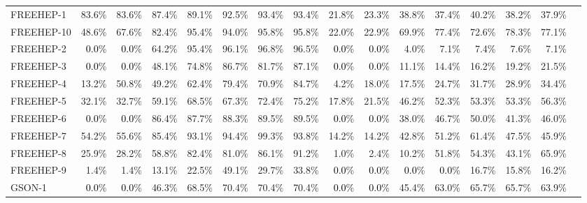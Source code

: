 \begin{tabular}{ l rrrrrrr rrrrrrrr}
FREEHEP-1 & 83.6\% & 83.6\% & 87.4\% & 89.1\% & 92.5\% & 93.4\% & 93.4\% & 21.8\% & 23.3\% & 38.8\% & 37.4\% & 40.2\% & 38.2\% & 37.9\%\\ 
FREEHEP-10 & 48.6\% & 67.6\% & 82.4\% & 95.4\% & 94.0\% & 95.8\% & 95.8\% & 22.0\% & 22.9\% & 69.9\% & 77.4\% & 72.6\% & 78.3\% & 77.1\%\\ 
FREEHEP-2 & \cellcolor{light-gray} \textcolor{black}{0.0}\% & \cellcolor{light-gray} \textcolor{black}{0.0}\% & 64.2\% & 95.4\% & 96.1\% & 96.8\% & 96.5\% & \cellcolor{light-gray} \textcolor{black}{0.0}\% & \cellcolor{light-gray} \textcolor{black}{0.0}\% & 4.0\% & 7.1\% & 7.4\% & 7.6\% & 7.1\%\\ 
FREEHEP-3 & \cellcolor{light-gray} \textcolor{black}{0.0}\% & \cellcolor{light-gray} \textcolor{black}{0.0}\% & 48.1\% & 74.8\% & 86.7\% & 81.7\% & 87.1\% & \cellcolor{light-gray} \textcolor{black}{0.0}\% & \cellcolor{light-gray} \textcolor{black}{0.0}\% & 11.1\% & 14.4\% & 16.2\% & 19.2\% & 21.5\%\\ 
FREEHEP-4 & 13.2\% & 50.8\% & 49.2\% & 62.4\% & 79.4\% & 70.9\% & 84.7\% & 4.2\% & 18.0\% & 17.5\% & 24.7\% & 31.7\% & 28.9\% & 34.4\%\\ 
FREEHEP-5 & 32.1\% & 32.7\% & 59.1\% & 68.5\% & 67.3\% & 72.4\% & 75.2\% & 17.8\% & 21.5\% & 46.2\% & 52.3\% & 53.3\% & 53.3\% & 56.3\%\\ 
FREEHEP-6 & \cellcolor{light-gray} \textcolor{black}{0.0}\% & \cellcolor{light-gray} \textcolor{black}{0.0}\% & 86.4\% & 87.7\% & 88.3\% & 89.5\% & 89.5\% & \cellcolor{light-gray} \textcolor{black}{0.0}\% & \cellcolor{light-gray} \textcolor{black}{0.0}\% & 38.0\% & 46.7\% & 50.0\% & 41.3\% & 46.0\%\\ 
FREEHEP-7 & 54.2\% & 55.6\% & 85.4\% & 93.1\% & 94.4\% & 99.3\% & 93.8\% & 14.2\% & 14.2\% & 42.8\% & 51.2\% & 61.4\% & 47.5\% & 45.9\%\\ 
FREEHEP-8 & 25.9\% & 28.2\% & 58.8\% & 82.4\% & 81.0\% & 86.1\% & 91.2\% & 1.0\% & 2.4\% & 10.2\% & 51.8\% & 54.3\% & 43.1\% & 65.9\%\\ 
FREEHEP-9 & 1.4\% & 1.4\% & 13.1\% & 22.5\% & 49.1\% & 29.7\% & 33.8\% & \cellcolor{light-gray} \textcolor{black}{0.0}\% & \cellcolor{light-gray} \textcolor{black}{0.0}\% & \cellcolor{light-gray} \textcolor{black}{0.0}\% & \cellcolor{light-gray} \textcolor{black}{0.0}\% & 16.7\% & 15.8\% & 16.2\%\\ 
GSON-1 & \cellcolor{light-gray} \textcolor{black}{0.0}\% & \cellcolor{light-gray} \textcolor{black}{0.0}\% & 46.3\% & 68.5\% & 70.4\% & 70.4\% & 70.4\% & \cellcolor{light-gray} \textcolor{black}{0.0}\% & \cellcolor{light-gray} \textcolor{black}{0.0}\% & 45.4\% & 63.0\% & 65.7\% & 65.7\% & 63.9\%\\ 

\end{tabular}
